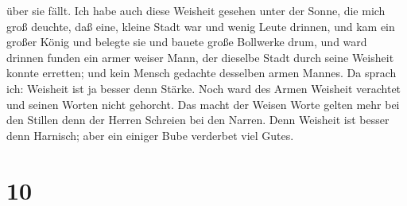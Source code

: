 über sie fällt.  Ich habe auch diese Weisheit gesehen unter
der Sonne, die mich groß deuchte,  daß eine, kleine Stadt
war und wenig Leute drinnen, und kam ein großer König und belegte sie
und bauete große Bollwerke drum,  und ward drinnen funden
ein armer weiser Mann, der dieselbe Stadt durch seine Weisheit konnte
erretten; und kein Mensch gedachte desselben armen Mannes. 
Da sprach ich: Weisheit ist ja besser denn Stärke. Noch ward des Armen
Weisheit verachtet und seinen Worten nicht gehorcht.  Das
macht der Weisen Worte gelten mehr bei den Stillen denn der Herren
Schreien bei den Narren.  Denn Weisheit ist besser denn
Harnisch; aber ein einiger Bube verderbet viel Gutes.

\hypertarget{section-9}{%
\section{10}\label{section-9}}

